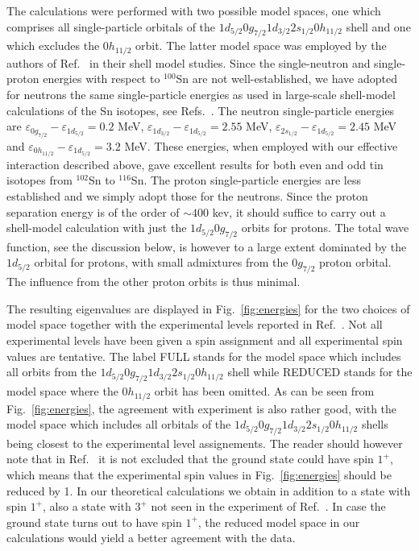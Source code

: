 \begin{multicols}{2}
The calculations were performed with two possible 
model spaces, one which comprises all single-particle orbitals of the 
$1d_{5/2}0g_{7/2}1d_{3/2}2s_{1/2}0h_{11/2}$ shell and one which excludes
the $0h_{11/2}$ orbit. 
The latter model space was employed by the authors of Ref.\ \cite{sb106}
in their shell model studies.
Since the single-neutron and single-proton
energies with respect to $^{100}$Sn are not well-established, we have adopted
for neutrons the same single-particle energies as used in large-scale
shell-model calculations of the Sn isotopes, see Refs.\ \cite{ehho98}.
The neutron single-particle energies are
$\varepsilon_{0g_{7/2}}-\varepsilon_{1d_{5/2}}=0.2$ MeV,
$\varepsilon_{1d_{3/2}}-\varepsilon_{1d_{5/2}}=2.55$ MeV,
$\varepsilon_{2s_{1/2}}-\varepsilon_{1d_{5/2}}=2.45$ MeV and
$\varepsilon_{0h_{11/2}}-\varepsilon_{1d_{5/2}}=3.2$ MeV.
These energies, when employed with our effective interaction described
above, gave excellent results for both even and odd
tin isotopes from $^{102}$Sn to $^{116}$Sn. 
The proton single-particle energies are less established and we simply adopt 
those for the neutrons. Since the proton separation energy is of the order
of $\sim 400$ kev, it should suffice to carry out a shell-model
calculation with just the $1d_{5/2}0g_{7/2}$ orbits for protons.
The total wave function, see the discussion below, is however
to a large extent 
dominated by the $1d_{5/2}$ orbital for protons, with small admixtures
from the $0g_{7/2}$ proton orbital. The influence from the other 
proton orbits is thus minimal. 

The resulting eigenvalues are displayed in Fig.\ \ref{fig:energies}
for the two choices of model space together with the experimental
levels reported in Ref.\ \cite{sb106}. Not all experimental
levels have been given a spin assignment and all experimental spin values
are tentative.  
The label FULL stands for the model space which includes all orbits
from the $1d_{5/2}0g_{7/2}1d_{3/2}2s_{1/2}0h_{11/2}$ shell while
REDUCED stands for the model space where the $0h_{11/2}$ orbit has been
omitted.
As can be seen from Fig.\ \ref{fig:energies}, the agreement with
experiment is also rather good, with the model space which includes
all orbitals of the $1d_{5/2}0g_{7/2}1d_{3/2}2s_{1/2}0h_{11/2}$ shells
being closest to the experimental level assignements.
The reader should however note that in Ref.\ \cite{sb106} it is not
excluded that the ground state could have spin $1^+$, which means
that the experimental spin values in Fig.\ \ref{fig:energies} 
should be reduced by 1. In our theoretical calculations we obtain in
addition to a state with spin $1^+$, also a state with $3^+$ not seen
in the experiment of Ref.\ \cite{sb106}. In case the ground state
turns out to have spin $1^+$, the reduced model space in our calculations
would yield a better agreement with the data.


\end{multicols}
